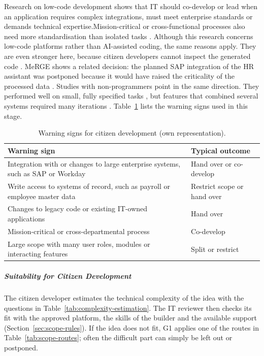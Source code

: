 \documentclass[10pt,a4paper]{article}
\begin{document}
Research on low-code development shows that IT should co-develop or lead when an application requires complex integrations, must meet enterprise standards or demands technical expertise.Mission-critical or cross-functional processes also need more standardisation than isolated tasks \parencite{viljoen2024}. Although this research concerns low-code platforms rather than AI-assisted coding, the same reasons apply. They are even stronger here, because citizen developers cannot inspect the generated code \parencite{kobiella2026}. MeRGE shows a related decision: the planned SAP integration of the HR assistant was postponed because it would have raised the criticality of the processed data \parencite{fetzer2026}. Studies with non-programmers point in the same direction. They performed well on small, fully specified tasks \parencite{esnaola2026}, but features that combined several systems required many iterations \parencite{fortesferreira2025}. Table~\ref{tab:stage1-warning-signs} lists the warning signs used in this stage.

\begin{table}[H]
    \centering
    \small
    \caption{Warning signs for citizen development (own representation).}
    \label{tab:stage1-warning-signs}
    \begin{tabular}{p{9.0cm} p{4.6cm}}
    \hline
    \textbf{Warning sign} & \textbf{Typical outcome} \\
    \hline
    Integration with or changes to large enterprise systems, such as SAP or Workday & Hand over or co-develop \\
    Write access to systems of record, such as payroll or employee master data & Restrict scope or hand over \\
    Changes to legacy code or existing IT-owned applications & Hand over \\
    Mission-critical or cross-departmental process & Co-develop \\
    Large scope with many user roles, modules or interacting features & Split or restrict \\
    
    \hline
    \end{tabular}
\end{table}

\subparagraph{Suitability for Citizen Development}

The citizen developer estimates the technical complexity of the idea
with the questions in Table~\ref{tab:complexity-estimation}. The IT
reviewer then checks its fit with the approved platform, the skills of
the builder and the available support
(Section~\ref{sec:scope-rules}). If the idea does not fit, G1 applies
one of the routes in Table~\ref{tab:scope-routes}; often the difficult
part can simply be left out or postponed.
\end{document}
